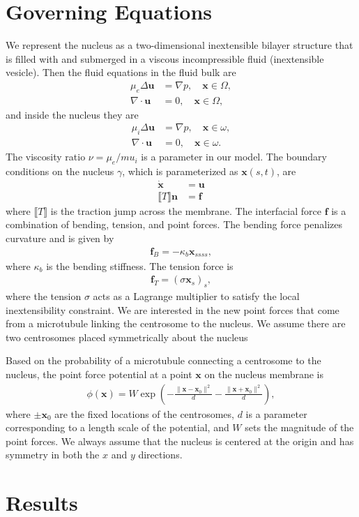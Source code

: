 \documentclass[11pt]{article}
\newcommand{\ff}{\mathbf{f}}
\newcommand{\nn}{\mathbf{n}}
\newcommand{\uu}{\mathbf{u}}
\newcommand{\xx}{\mathbf{x}}
\begin{document}
\section{Governing Equations}
We represent the nucleus as a two-dimensional inextensible bilayer
structure that is filled with and submerged in a viscous incompressible
fluid (inextensible vesicle).  Then the fluid equations in the fluid
bulk are
\begin{align}
  \mu_e \Delta \uu &= \nabla p, \quad \xx \in \Omega, \\
  \nabla \cdot \uu &= 0, \quad \xx \in \Omega,
\end{align}
and inside the nucleus they are
\begin{align}
  \mu_i \Delta \uu &= \nabla p, \quad \xx \in \omega, \\
  \nabla \cdot \uu &= 0, \quad \xx \in \omega.
\end{align}
The viscosity ratio $\nu = \mu_e/mu_i$ is a parameter in our model.  The
boundary conditions on the nucleus $\gamma$, which is parameterized as
$\xx(s,t)$, are 
\begin{align}
  \dot{\xx} &= \uu \\
  \llbracket T \rrbracket \nn &= \ff
\end{align}
where $\llbracket T \rrbracket$ is the traction jump across the
membrane.  The interfacial force $\ff$ is a combination of bending,
tension, and point forces.  The bending force penalizes curvature and is
given by
\begin{align}
  \ff_B = -\kappa_b \xx_{ssss},
\end{align}
where $\kappa_b$ is the bending stiffness.  The tension force is
\begin{align}
  \ff_T = (\sigma \xx_s)_s,
\end{align}
where the tension $\sigma$ acts as a Lagrange multiplier to satisfy the
local inextensibility constraint.  We are interested in the new point
forces that come from a microtubule linking the centrosome to the
nucleus.  We assume there are two centrosomes placed symmetrically about
the nucleus

Based on the probability of a microtubule connecting a centrosome to the
nucleus, the point force potential at a point $\xx$ on the nucleus
membrane is
\begin{align}
  \phi(\xx) = W\exp\left(-\frac{\|\xx - \xx_0\|^2}{d} 
                         -\frac{\|\xx + \xx_0\|^2}{d}\right),
\end{align}
where $\pm \xx_0$ are the fixed locations of the centrosomes, $d$ is
a parameter corresponding to a length scale of the potential, and $W$
sets the magnitude of the point forces.  We always assume that the
nucleus is centered at the origin and has symmetry in both the $x$ and
$y$ directions.


\section{Results}
\end{document}
